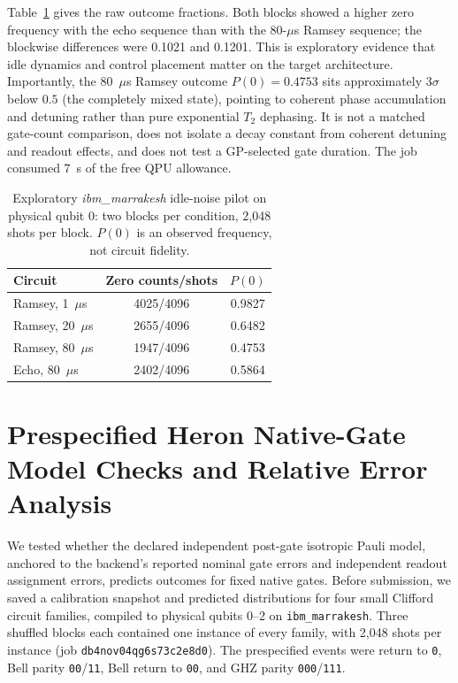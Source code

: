 \documentclass[10pt,letterpaper,journal]{IEEEtran}
\begin{document}
Table~\ref{tab:hardware_idle} gives the raw outcome fractions. Both blocks showed a higher zero frequency with the echo sequence than with the 80-$\mu$s Ramsey sequence; the blockwise differences were 0.1021 and 0.1201. This is exploratory evidence that idle dynamics and control placement matter on the target architecture. Importantly, the 80~$\mu$s Ramsey outcome $P(0) = 0.4753$ sits approximately $3\sigma$ below $0.5$ (the completely mixed state), pointing to coherent phase accumulation and detuning rather than pure exponential $T_2$ dephasing. It is not a matched gate-count comparison, does not isolate a decay constant from coherent detuning and readout effects, and does not test a GP-selected gate duration. The job consumed 7~s of the free QPU allowance.

\begin{table}[t]
\centering\caption{Exploratory \emph{ibm\_marrakesh} idle-noise pilot on physical qubit 0: two blocks per condition, 2,048 shots per block. $P(0)$ is an observed frequency, not circuit fidelity.}\label{tab:hardware_idle}
\begin{tabular}{lcc}\hline
Circuit & Zero counts/shots & $P(0)$\\\hline
Ramsey, 1~$\mu$s & 4025/4096 & 0.9827\\
Ramsey, 20~$\mu$s & 2655/4096 & 0.6482\\
Ramsey, 80~$\mu$s & 1947/4096 & 0.4753\\
Echo, 80~$\mu$s & 2402/4096 & 0.5864\\\hline
\end{tabular}
\end{table}

\section{Prespecified Heron Native-Gate Model Checks and Relative Error Analysis}\label{app:model_checks}
We tested whether the declared independent post-gate isotropic Pauli model, anchored to the backend's reported nominal gate errors and independent readout assignment errors, predicts outcomes for fixed native gates. Before submission, we saved a calibration snapshot and predicted distributions for four small Clifford circuit families, compiled to physical qubits 0--2 on \texttt{ibm\_marrakesh}. Three shuffled blocks each contained one instance of every family, with 2,048 shots per instance (job \texttt{db4nov04qg6s73c2e8d0}). The prespecified events were return to \texttt{0}, Bell parity \texttt{00}/\texttt{11}, Bell return to \texttt{00}, and GHZ parity \texttt{000}/\texttt{111}.
\end{document}
